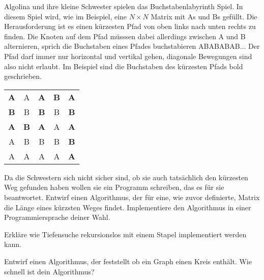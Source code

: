 \documentclass{uebung_cs}
\begin{document}
\begin{aufgabe}[Buchstabenlabyrinth]
	Algolina und ihre kleine Schwester spielen das Buchstabenlabyrinth Spiel.
	In diesem Spiel wird, wie im Beispiel, eine $N\times N$ Matrix mit As und Bs gefüllt.
	Die Herausforderung ist es einen kürzesten Pfad von oben links nach unten rechts zu finden.
	Die Knoten auf dem Pfad müsssen dabei allerdings zwischen A und B alternieren, sprich die Buchstaben eines Pfades buchstabieren ABABABAB...
	Der Pfad darf immer nur horizontal und vertikal gehen, diagonale Bewegungen sind also nicht erlaubt.
	Im Beispiel sind die Buchstaben des kürzesten Pfads bold geschrieben.
	\begin{center}
		\begin{tabular}{ccccc}
			\textbf{A} & A & \textbf{A} & \textbf{B} & \textbf{A}\\
			\textbf{B} & B & \textbf{B} & B & \textbf{B}\\
			\textbf{A} & \textbf{B} & \textbf{A} & A & \textbf{A}\\
			A & B & B & B & \textbf{B}\\
			A & A & A & A & \textbf{A}
		\end{tabular}
	\end{center}
	Da die Schwestern sich nicht sicher sind, ob sie auch tatsächlich den kürzesten Weg gefunden haben wollen sie ein Programm schreiben, das es für sie beantwortet.
	Entwirf einen Algorithmus, der für eine, wie zuvor definierte, Matrix die Länge eines kürzsten Weges findet.
	Implementiere den Algorithmus in einer Programmiersprache deiner Wahl.
\end{aufgabe}

\begin{aufgabe}
	Erkläre wie Tiefensuche rekursionslos mit einem Stapel implementiert werden kann.
\end{aufgabe}

\begin{aufgabe}
	Entwirf einen Algorithmus, der feststellt ob ein Graph einen Kreis enthält.
	Wie schnell ist dein Algorithmus?
\end{aufgabe}
\end{document}
